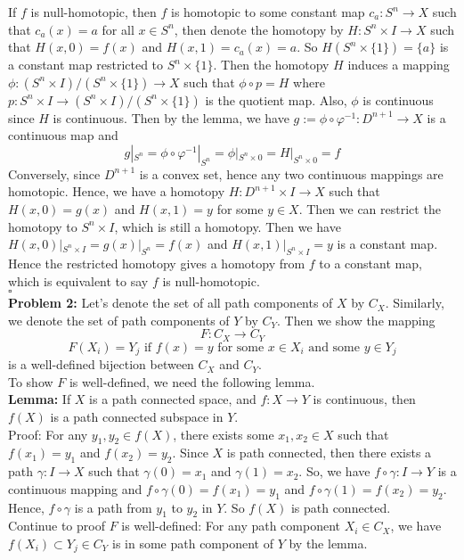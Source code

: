 \documentclass[12pt]{amsart}
\begin{document}
If $f$ is null-homotopic, then $f$ is homotopic to some constant map $c_a:S^n \rightarrow X$ such that $c_a(x)=a$ for all $x\in S^n$, then denote the homotopy by $H:S^n \times I \rightarrow X$ such that $H(x,0)=f(x)$ and $H(x,1)=c_a(x)=a$. So $H(S^n\times \{1\})=\{a\}$ is a constant map restricted to $S^n\times \{1\}$. Then the homotopy $H$ induces a mapping $\phi: (S^n\times I)/(S^n\times \{1\})\rightarrow X$ such that $\phi\circ p=H$ where $p: S^n\times I\rightarrow (S^n\times I)/(S^n\times \{1\})$ is the quotient map. Also, $\phi$ is continuous since $H$ is continuous. Then by the lemma, we have $g:=\phi\circ\varphi^{-1}:D^{n+1}\rightarrow X$ is a continuous map and
\[g|_{S^n}=\phi\circ\varphi^{-1}|_{S^n}=\phi|_{S^n\times{0}}=H|_{S^n\times{0}}=f\]
Conversely, since $D^{n+1}$ is a convex set, hence any two continuous mappings are homotopic. Hence, we have a homotopy $H:D^{n+1}\times I \rightarrow X$ such that $H(x,0)=g(x)$ and $H(x,1)=y$ for some $y\in X$. Then we can restrict the homotopy to $S^n\times I$, which is still a homotopy. Then we have $H(x,0)|_{S^n\times I}=g(x)|_{S^n}=f(x)$ and $H(x,1)|_{S^n\times I}=y$ is a constant map. Hence the restricted homotopy gives a homotopy from $f$ to a constant map, which is equivalent to say $f$ is null-homotopic.
\\\phantom{qed}\hfill$\square$\\
\textbf{Problem 2:} Let's denote the set of all path components of $X$ by $C_X$. Similarly, we denote the set of path components of $Y$ by $C_Y$. Then we show the mapping
\[F:C_X \rightarrow C_Y\]
\[F(X_i)=Y_j \text{ if } f(x)=y \text{ for some $x\in X_i$ and some $y\in Y_j$}\]
is a well-defined bijection between $C_X$ and $C_Y$.\\
To show $F$ is well-defined, we need the following lemma.\\
\textbf{Lemma:} If $X$ is a path connected space, and $f:X \rightarrow Y$ is continuous, then $f(X)$ is a path connected subspace in $Y$.\\
Proof: For any $y_1,y_2\in f(X)$, there exists some $x_1,x_2\in X$ such that $f(x_1)=y_1$ and $f(x_2)=y_2$. Since $X$ is path connected, then there exists a path $\gamma: I \rightarrow X$ such that $\gamma(0)=x_1$ and $\gamma(1)=x_2$. So, we have $f\circ \gamma:I\rightarrow Y$ is a continuous mapping and $f\circ \gamma(0)=f(x_1)=y_1$ and $f\circ \gamma(1)=f(x_2)=y_2$. Hence, $f\circ \gamma$ is a path from $y_1$ to $y_2$ in $Y$. So $f(X)$ is path connected.\\
Continue to proof $F$ is well-defined: For any path component $X_i\in C_X$, we have $f(X_i)\subset Y_j\in C_Y$ is in some path component of $Y$ by the lemma.\\
\end{document}
